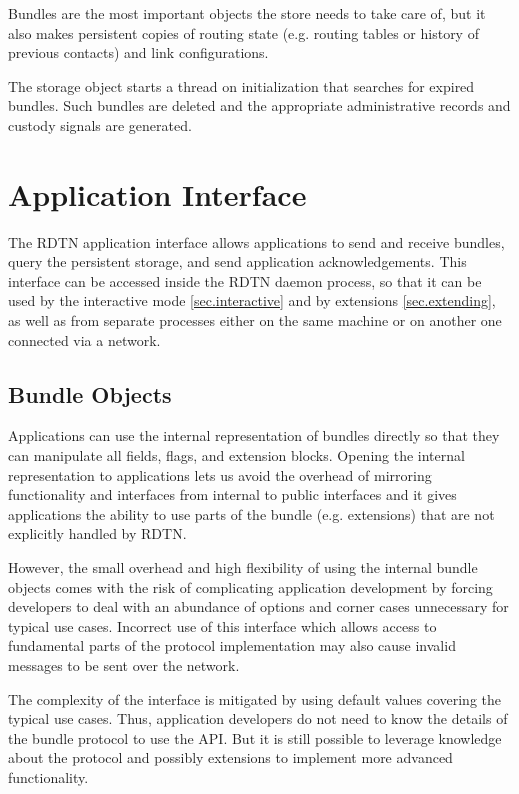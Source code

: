 \documentclass{article}
\begin{document}
Bundles are the most important objects the store needs to take care of, but
it also makes persistent copies of routing state (e.g. routing
tables or history of previous contacts) and link configurations.

The storage object starts a thread on initialization that searches
for expired bundles. Such bundles are deleted and the appropriate administrative
records and custody signals are generated.

\section{Application Interface}\label{sec.appif}

The RDTN application interface allows applications to send and receive bundles,
query the persistent storage, and send application acknowledgements. This
interface can be accessed inside the RDTN daemon process, so that it can be used
by the interactive mode \ref{sec.interactive} and by extensions
\ref{sec.extending}, as well as from separate processes either on the same
machine or on another one connected via a network.

\subsection{Bundle Objects}\label{sec.bundle-obj}

Applications can use the internal representation of bundles directly so that
they can manipulate all fields, flags, and extension blocks. Opening the
internal representation to applications lets us avoid the overhead of mirroring
functionality and interfaces from internal to public interfaces and it gives
applications the ability to use parts of the bundle (e.g. extensions) that are
not explicitly handled by RDTN.

However, the small overhead and high flexibility of using the internal bundle
objects comes with the risk of complicating application development by forcing
developers to deal with an abundance of options and corner cases unnecessary for
typical use cases. Incorrect use of this interface which allows access to
fundamental parts of the protocol implementation may also cause invalid messages
to be sent over the network.

The complexity of the interface is mitigated by using default values covering the
typical use cases. Thus, application developers do not need to know the details
of the bundle protocol to use the API. But it is still possible to leverage
knowledge about the protocol and possibly extensions to implement more advanced
functionality.
\end{document}
